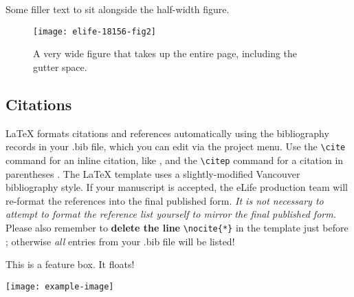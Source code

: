 Some filler text to sit alongside the half-width figure. \lipsum[1-2]

\begin{figure}
\begin{fullwidth}
\texttt{[image: elife-18156-fig2]}
\caption{A very wide figure that takes up the entire page, including the gutter space.}
\label{fig:fullwidth}
\end{fullwidth}
\end{figure}

\subsection{Citations}

LaTeX formats citations and references automatically using the bibliography records in your .bib file, which you can edit via the project menu. Use the \verb|\cite| command for an inline citation, like \cite{Aivazian917}, and the \verb|\citep| command for a citation in parentheses \citep{Aivazian917}. The LaTeX template uses a slightly-modified Vancouver bibliography style. If your manuscript is accepted, the eLife production team will re-format the references into the final published form. \emph{It is not necessary to attempt to format the reference list yourself to mirror the final published form.} Please also remember to \textbf{delete the line} \verb|\nocite{*}| in the template just before \verb||; otherwise \emph{all} entries from your .bib file will be listed! 

\begin{featurebox}
\caption{This is an example feature box}
\label{box:simple}
This is a feature box. It floats!
\medskip

\texttt{[image: example-image]}

\lipsum[1]
\end{featurebox}

